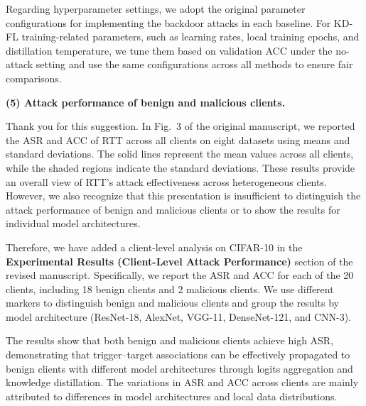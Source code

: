 \documentclass[11pt,a4paper]{article}
\newcommand{\manualindent}{\par\noindent\hspace*{1.5em}\ignorespaces}
\begin{document}
{\manualindent Regarding hyperparameter settings, we adopt the original parameter configurations for implementing the backdoor attacks in each baseline. 
For KD-FL training-related parameters, such as learning rates, local training epochs, and distillation temperature, we tune them based on validation ACC under the no-attack setting and use the same configurations across all methods to ensure fair comparisons.

\textbf{(5) Attack performance of benign and malicious clients.}

\manualindent Thank you for this suggestion. 
In Fig.~3 of the original manuscript, we reported the ASR and ACC of RTT across all clients on eight datasets using means and standard deviations. 
The solid lines represent the mean values across all clients, while the shaded regions indicate the standard deviations. 
These results provide an overall view of RTT's attack effectiveness across heterogeneous clients. 
However, we also recognize that this presentation is insufficient to distinguish the attack performance of benign and malicious clients or to show the results for individual model architectures.

\manualindent Therefore, we have added a client-level analysis on CIFAR-10 in the \textbf{Experimental Results (Client-Level Attack Performance)} section of the revised manuscript.
Specifically, we report the ASR and ACC for each of the 20 clients, including 18 benign clients and 2 malicious clients.
We use different markers to distinguish benign and malicious clients and group the results by model architecture (ResNet-18, AlexNet, VGG-11, DenseNet-121, and CNN-3).

\manualindent The results show that both benign and malicious clients achieve high ASR, demonstrating that trigger--target associations can be effectively propagated to benign clients with different model architectures through logits aggregation and knowledge distillation. 
The variations in ASR and ACC across clients are mainly attributed to differences in model architectures and local data distributions.}
\end{document}
